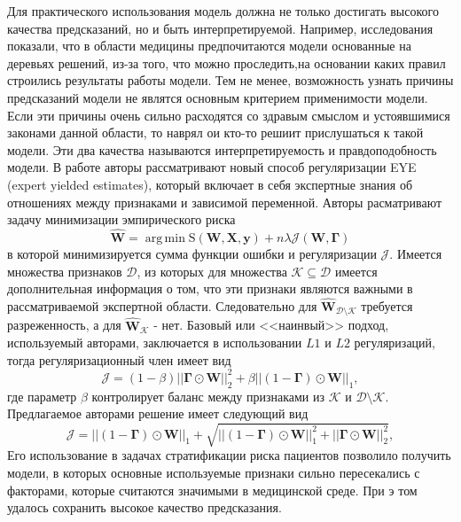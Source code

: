 \documentclass[12pt, twoside]{article}
\newcommand{\X}{\mathbf{X}}
\newcommand{\w}{{\mathbf{W}}}
\DeclareMathOperator*{\argmin}{arg\,min}
\begin{document}
Для практического использования модель должна не только достигать высокого качества предсказаний, но и быть интерпретируемой. Например, исследования показали, что в области медицины предпочитаются модели основанные на деревьях решений, из-за того, что можно проследить,на основании каких правил строились результаты работы модели. Тем не менее, возможность узнать причины предсказаний модели не являтся основным критерием применимости модели. Если эти причины очень сильно расходятся со здравым смыслом и устоявшимися законами данной области, то наврял ои кто-то решиит прислушаться к такой модели. Эти два качества называются интерпретируемость и правдоподобность модели. В работе \cite{wang2018learning} авторы рассматривают новый способ регуляризации EYE (expert yielded estimates), который включает в себя экспертные знания об отношениях между признаками и зависимой переменной. Авторы расматривают задачу минимизации эмпирического риска
\begin{equation}\label{eq1}
\hat{\mathbf{\w}} = \argmin\text{S}(\w,\X,\mathbf{y})+n\lambda\mathcal{J}(\w,\mathbf{\Gamma})
\end{equation}
в которой минимизируется сумма функции ошибки и регуляризации $\mathcal{J}$. Имеется множества признаков $\mathcal{D}$, из которых для множества $\mathcal{K}\subseteq\mathcal{D}$ имеется дополнительная информация о том, что эти признаки являются важными в рассматриваемой экспертной области. Следовательно для $\hat{\mathbf{\w}}_{\mathcal{D}\setminus\mathcal{K}}$ требуется разреженность, а для $\hat{\mathbf{\w}}_{\mathcal{K}}$ - нет. Базовый или <<наинвый>> подход, используемый авторами, заключается в использовании $L1$ и $L2$ регуляризаций, тогда регуляризационный член имеет вид
\begin{equation}\label{eq2}
\mathcal{J} = (1-\beta)||\mathbf{\Gamma}\odot\w||^2_2+\beta||(1-\mathbf{\Gamma})\odot\w||_1,
\end{equation}
где параметр $\beta$ контролирует баланс между признаками из $\mathcal{K}$ и $\mathcal{D}\setminus\mathcal{K}$. Предлагаемое авторами решение имеет следующий вид
\begin{equation}\label{eq3}
\mathcal{J} = ||(1-\mathbf{\Gamma})\odot\w||_1 + \sqrt{ ||(1-\mathbf{\Gamma})\odot\w||^2_1+||\mathbf{\Gamma}\odot\w||^2_2},
\end{equation}
Его  использование в задачах стратификации риска пациентов позволило получить модели, в которых основные используемые признаки сильно пересекались с факторами, которые считаются значимыми в медицинской среде. При э том удалось сохранить высокое качество предсказания.
\end{document}
